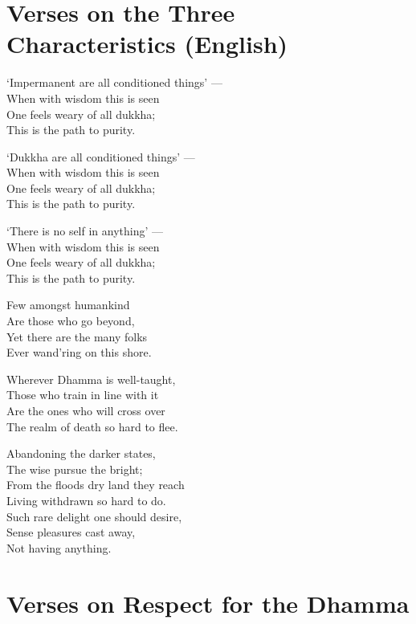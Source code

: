 
\section{Verses on the Three Characteristics (English)}

`Impermanent are all conditioned things' ---\\
When with wisdom this is seen\\
One feels weary of all dukkha;\\
This is the path to purity.

`Dukkha are all conditioned things' ---\\
When with wisdom this is seen\\
One feels weary of all dukkha;\\
This is the path to purity.

`There is no self in anything' ---\\
When with wisdom this is seen\\
One feels weary of all dukkha;\\
This is the path to purity.

Few amongst humankind\\
Are those who go beyond,\\
Yet there are the many folks\\
Ever wand'ring on this shore.

Wherever Dhamma is well-taught,\\
Those who train in line with it\\
Are the ones who will cross over\\
The realm of death so hard to flee.

Abandoning the darker states,\\
The wise pursue the bright;\\
From the floods dry land they reach\\
Living withdrawn so hard to do.\\
Such rare delight one should desire,\\
Sense pleasures cast away,\\
Not having anything.

\section{Verses on Respect for the Dhamma}

\begin{leader}
\end{leader}

